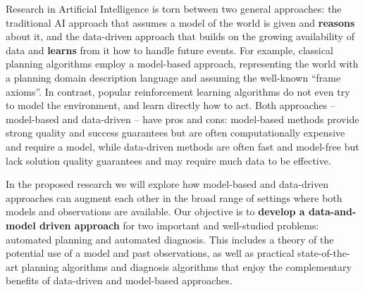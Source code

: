 \documentclass[12pt]{article}
\begin{document}
Research in Artificial Intelligence is torn between two general approaches: the traditional AI approach that assumes a model of the world is given and {\bf reasons} about it, and the data-driven  approach that builds on the growing availability of data and {\bf learns} from it how to handle future events. For example, classical planning algorithms employ a model-based approach, representing the world with a planning domain description language and assuming the well-known ``frame axioms''. In contrast, popular reinforcement learning algorithms do not even try to model the environment, and learn directly how to act. Both approaches -- model-based and data-driven -- have pros and cons: model-based methods provide strong quality and success guarantees but are often computationally expensive and require a model, while data-driven methods are often fast and model-free but lack solution quality guarantees and may require much data to be effective. 
 


In the proposed research we will explore how model-based and data-driven approaches can augment each other in the broad range of settings where both models and observations are available. Our objective is to {\bf develop a data-and-model driven approach} for two important and well-studied problems: automated planning and automated diagnosis. This includes a theory of the potential use of a model and past observations, as well as practical state-of-the-art planning algorithms and diagnosis algorithms that enjoy the complementary benefits of data-driven and model-based approaches. 


\end{document}
